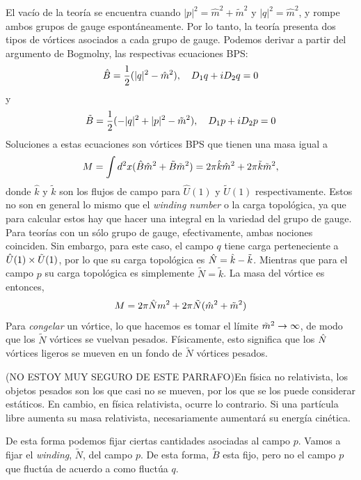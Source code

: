 El vacío de la teoría se encuentra cuando $|p|^2 = \hat m^2+\tilde m^2$ y $|q|^2=\hat m^2$, y rompe ambos grupos de gauge espontáneamente. Por lo tanto, la teoría presenta dos tipos de vórtices asociados a cada grupo de gauge. Podemos derivar a partir del argumento de Bogmolny, las respectivas ecuaciones BPS:
\begin{align}
	\hat B = \frac{1}{2}(|q|^2-\hat m^2), \ \ \ D_1q+iD_2 q =0 \label{eq:7.3.0.2}
\end{align}
y
\begin{align}
	\tilde B = \frac{1}{2}(-|q|^2+|p|^2-\tilde m^2), \ \ \ D_1 p+iD_2p =0 \label{eq:7.3.0.3}
\end{align}
Soluciones a estas ecuaciones son vórtices BPS que tienen una masa igual a
\begin{align}
	M = \int d^2x (\hat B\hat m^2+\tilde B\tilde m^2) = 2\pi\hat k\hat m^2+2\pi\tilde k\tilde m^2,
\end{align}
donde $\hat k$ y $\tilde k$ son los flujos de campo para $\hat U(1)$ y $\tilde U(1)$ respectivamente. Estos no son en general lo mismo que el \emph{winding number} o la carga topológica, ya que para calcular estos hay que hacer una integral en la variedad del grupo de gauge. Para teorías con un sólo grupo de gauge, efectivamente, ambas nociones coinciden. Sin embargo, para este caso, el campo $q$ tiene carga perteneciente a $\hat U(1)\times\tilde U(1)$,  por lo que su carga topológica es $\hat N=\hat k-\tilde k$. Mientras que para el campo $p$ su carga topológica es simplemente $\tilde N=\tilde k$. La masa del vórtice es entonces,
\begin{align}
	M = 2\pi\hat N m^2+2\pi\tilde N(\hat m^2+\tilde m^2)
\end{align}
Para \emph{congelar} un vórtice, lo que hacemos es tomar el límite $\tilde m^2\rightarrow\infty$, de modo que los $\tilde N$ vórtices se vuelvan pesados. Físicamente, esto significa que los $\hat N$ vórtices ligeros se mueven en un fondo de $\tilde N$ vórtices pesados.

(NO ESTOY MUY SEGURO DE ESTE PARRAFO)En física no relativista, los objetos pesados son los que casi no se mueven, por los que se los puede considerar estáticos. En cambio, en física relativista, ocurre lo contrario. Si una partícula libre aumenta su masa relativista, necesariamente aumentará su energía cinética.

De esta forma podemos fijar ciertas cantidades asociadas al campo $p$. Vamos a fijar el \emph{winding}, $\tilde N$, del campo $p$. De esta forma, $\tilde B$ esta fijo, pero no el campo  $p$ que fluctúa de acuerdo a como fluctúa $q$.

